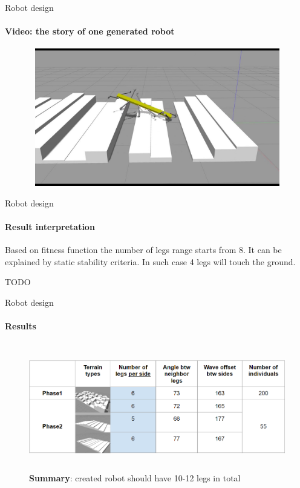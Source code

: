 \documentclass[aspectratio=169]{beamer}
\begin{document}
\begin{frame}[t]{Robot design}
    \framesubtitle{Video: the story of one generated robot}
    \vspace{-0.6cm}
    \begin{figure}[H]
        \href{https://youtu.be/DcovvkTZgsg}{
            \centering\includegraphics[height=6cm,width=1\textwidth,keepaspectratio]{genetic_video_preview.jpg}}
    \end{figure}
\end{frame}

\begin{frame}[t]{Robot design}
    \framesubtitle{Result interpretation}
    Based on fitness function the number of legs range starts from 8. It can be explained by static stability criteria. In such case 4 legs will touch the ground.

    \alert{TODO}
\end{frame}

\begin{frame}[t]{Robot design}
    \framesubtitle{Results}
    \vspace{-0.5cm}
    \begin{figure}[H]
        \centering\includegraphics[height=5.5cm,width=1\textwidth,keepaspectratio]{table_terrain.png}
        \caption*{\LARGE\centering\textbf{Summary}: created robot should have 10-12 legs in total}
        \label{fig:table_terrain.png}
    \end{figure}
\end{frame}
\end{document}
